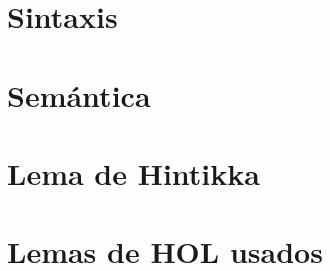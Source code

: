\documentclass[12pt,a4paper,twoside]{book}
\begin{document}
\chapter{Sintaxis}


\chapter{Semántica}


\chapter{Lema de Hintikka}


\appendix
\chapter{Lemas de HOL usados}


\nocite{fitting1996first,LMF,CC,articulo,escribir,tutorial,main,isar,implementation,intro,gamut,modal,proofsystems,automatic,coq}


\end{document}
